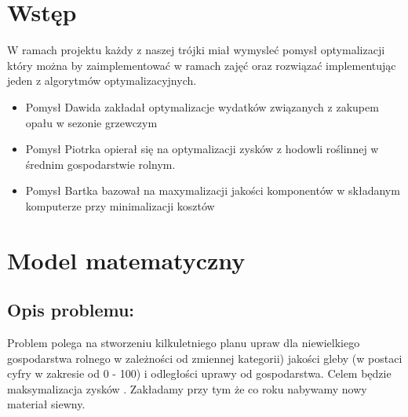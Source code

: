 \documentclass[12pt,a4paper]{article}
\begin{document}
\tableofcontents

\section{Wstęp}
W ramach projektu każdy z naszej trójki miał wymysleć pomysł optymalizacji który można by zaimplementować w ramach zajęć oraz rozwiązać implementując jeden z algorytmów optymalizacyjnych.

\begin{itemize}
	\item Pomysł Dawida zakładał optymalizacje wydatków związanych z zakupem opału w sezonie grzewczym
	\item Pomysł Piotrka opierał się na optymalizacji zysków z hodowli roślinnej w średnim gospodarstwie rolnym.
	\item Pomysł Bartka bazował na maxymalizacji jakości komponentów w składanym komputerze przy minimalizacji kosztów
\end{itemize} 


\section{Model matematyczny}

	\subsection{Opis problemu:}
	Problem polega na stworzeniu kilkuletniego planu upraw dla niewielkiego gospodarstwa rolnego w zależności od zmiennej kategorii) jakości gleby (w postaci cyfry w zakresie od 0 - 100) i  odległości uprawy od gospodarstwa. Celem będzie maksymalizacja zysków . Zakładamy przy tym że co roku nabywamy nowy materiał siewny.
\end{document}

